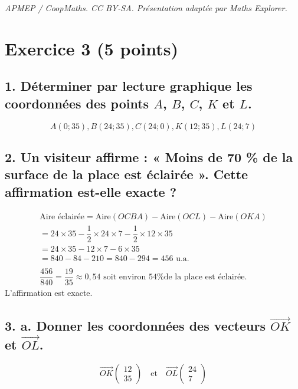 \documentclass[10pt]{article}
\begin{document}
\noindent\textit{APMEP / CoopMaths. CC BY-SA. Présentation adaptée par Maths Explorer.}\par\medskip
\section*{Exercice 3 (5 points)}	
	\subsection*{1. Déterminer par lecture graphique les coordonnées des points $A$, $B$, $C$, $K$ et $L$.}
	
	\[
	A(0; 35), B(24; 35), C(24; 0), K(12; 35), L(24; 7)
	\]
	
	\subsection*{2. Un visiteur affirme : « Moins de 70 \% de la surface de la place est éclairée ». Cette affirmation est-elle exacte ?}
	
	\[
	\begin{array}{l}
		\text{Aire éclairée} = \text{Aire}(OCBA) - \text{Aire}(OCL) - \text{Aire}(OKA) \\
		= 24 \times 35 - \dfrac{1}{2} \times 24 \times 7 - \dfrac{1}{2} \times 12 \times 35 \\
		= 24 \times 35 - 12 \times 7 - 6 \times 35 \\
		= 840 - 84 - 210 = 840 - 294 = 456 \text{ u.a.} \\
		\\
		\dfrac{456}{840} = \dfrac{19}{35} \approx 0,54 \text{ soit environ 54\% de la place est éclairée.}
	\end{array}
	\]
L’affirmation est exacte.
	
	\subsection*{3. a. Donner les coordonnées des vecteurs $\overrightarrow{OK}$ et $\overrightarrow{OL}$.}
	
	\[
	\overrightarrow{OK} \left( \begin{array}{c} 12 \\ 35 \end{array} \right) \quad \text{et} \quad \overrightarrow{OL} \left( \begin{array}{c} 24 \\ 7 \end{array} \right)
	\]
	
\end{document}
